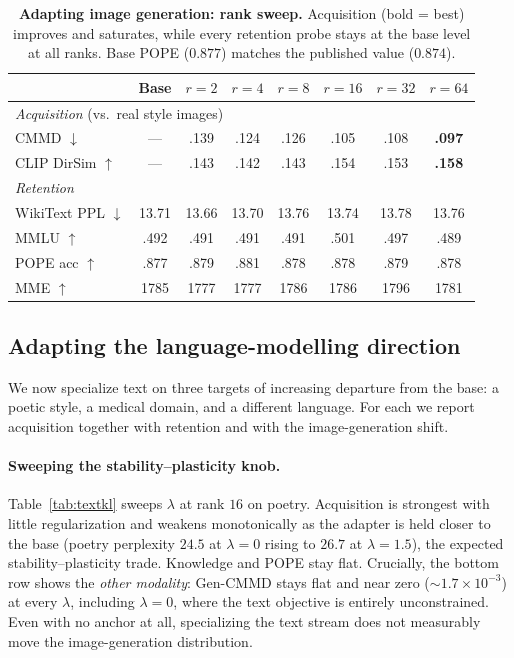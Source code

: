 \documentclass{article}
\begin{document}
\begin{table}[t]
\caption{\textbf{Adapting image generation: rank sweep.} Acquisition (bold =
best) improves and saturates, while every retention probe stays at the base
level at all ranks. Base POPE ($0.877$) matches the published value ($0.874$).}
\label{tab:rank}
\centering\small
\begin{tabular}{lccccccc}
\toprule
& Base & $r{=}2$ & $r{=}4$ & $r{=}8$ & $r{=}16$ & $r{=}32$ & $r{=}64$ \\
\midrule
\multicolumn{8}{l}{\emph{Acquisition} (vs.\ real style images)}\\
CMMD $\downarrow$        & --- & .139 & .124 & .126 & .105 & .108 & \textbf{.097} \\
CLIP DirSim $\uparrow$   & --- & .143 & .142 & .143 & .154 & .153 & \textbf{.158} \\
\midrule
\multicolumn{8}{l}{\emph{Retention}}\\
WikiText PPL $\downarrow$ & 13.71 & 13.66 & 13.70 & 13.76 & 13.74 & 13.78 & 13.76 \\
MMLU $\uparrow$           & .492 & .491 & .491 & .491 & .501 & .497 & .489 \\
POPE acc $\uparrow$       & .877 & .879 & .881 & .878 & .878 & .879 & .878 \\
MME $\uparrow$            & 1785 & 1777 & 1777 & 1786 & 1786 & 1796 & 1781 \\
\bottomrule
\end{tabular}
\end{table}

\subsection{Adapting the language-modelling direction}
\label{sec:text}
We now specialize text on three targets of increasing departure from the base: a
poetic style, a medical domain, and a different language. For each we report
acquisition together with retention and with the image-generation shift.

\paragraph{Sweeping the stability--plasticity knob.}
Table~\ref{tab:textkl} sweeps $\lambda$ at rank $16$ on poetry. Acquisition is
strongest with little regularization and weakens monotonically as the adapter is
held closer to the base (poetry perplexity $24.5$ at $\lambda=0$ rising to
$26.7$ at $\lambda=1.5$), the expected stability--plasticity trade. Knowledge
and POPE stay flat. Crucially, the bottom row shows the \emph{other modality}:
Gen-CMMD stays flat and near zero ($\sim\!1.7\times10^{-3}$) at every $\lambda$,
including $\lambda=0$, where the text objective is entirely unconstrained. Even
with no anchor at all, specializing the text stream does not measurably move the
image-generation distribution.
\end{document}
